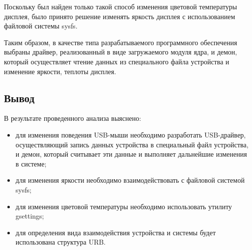 Поскольку был найден только такой способ изменения цветовой температуры дисплея, было принято решение изменять яркость дисплея с использованием файловой системы sysfs.

Таким образом, в качестве типа разрабатываемого программного обеспечения выбраны драйвер, реализованный в виде загружаемого модуля ядра, и демон, который осуществляет чтение данных из специального файла устройства и изменение яркости, теплоты дисплея.

\subsection*{Вывод}

В результате проведенного анализа выяснено:

\begin{itemize}
	\item для изменения поведения USB-мыши необходимо разработать USB-драйвер, осуществляющий запись данных устройства в специальный файл устройства, и демон, который считывает эти данные и выполняет дальнейшие изменения в системе;
	\item для изменения яркости необходимо взаимодействовать с файловой системой sysfs;
	\item для изменения цветовой температуры необходимо использовать утилиту gsettings;
	\item для определения вида взаимодействия устройства и системы будет использована структура URB.
\end{itemize}